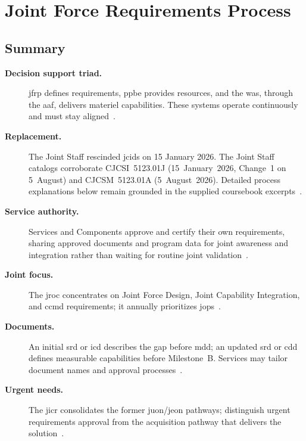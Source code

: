 \documentclass[../main.tex]{subfiles}
\begin{document}
\section{Joint Force Requirements Process}
\label{sec:jfrp}

\subsection{Summary}
\begin{description}
  \item[\textbf{Decision support triad.}] \ac{jfrp} defines requirements, \ac{ppbe} provides resources, and the \ac{was}, through the \ac{aaf}, delivers materiel capabilities. These systems operate continuously and must stay aligned~\autocite{edo-3-3-3-jfrp-2026}.
  \item[\textbf{Replacement.}] The Joint Staff rescinded \ac{jcids} on 15 January 2026. The Joint Staff catalogs corroborate CJCSI~5123.01J (15~January~2026, Change~1 on 5~August) and CJCSM~5123.01A (5~August~2026). Detailed process explanations below remain grounded in the supplied coursebook excerpts~\autocite{JCS-Requirements-Instructions-20261020,JCS-Requirements-Manuals-20261020,edo-3-3-3-jfrp-2026}.
  \item[\textbf{Service authority.}] Services and Components approve and certify their own requirements, sharing approved documents and program data for joint awareness and integration rather than waiting for routine joint validation~\autocite[slides 7--10, 34]{edo-3-3-3-jfrp-2026}.
  \item[\textbf{Joint focus.}] The \ac{jroc} concentrates on Joint Force Design, Joint Capability Integration, and \ac{ccmd} requirements; it annually prioritizes \acp{jop}~\autocite[slides 9, 30--33]{edo-3-3-3-jfrp-2026}.
  \item[\textbf{Documents.}] An initial \ac{srd} or \ac{icd} describes the gap before \ac{mdd}; an updated \ac{srd} or \ac{cdd} defines measurable capabilities before Milestone~B. Services may tailor document names and approval processes~\autocite[slides 7, 20--23]{edo-3-3-3-jfrp-2026}.
  \item[\textbf{Urgent needs.}] The \ac{jicr} consolidates the former \ac{juon}/\ac{jeon} pathways; distinguish urgent requirements approval from the acquisition pathway that delivers the solution~\autocite{edo-3-3-3-jfrp-2026,edo-3-3-2-acq-milestones-phases-2025}.
\end{description}
\end{document}
